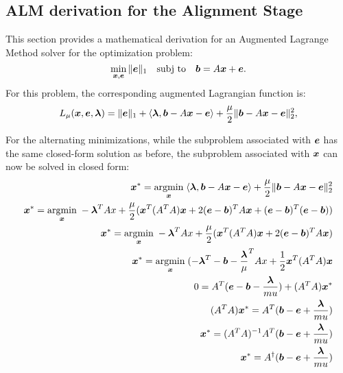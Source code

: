 \subsection{ALM derivation for the Alignment Stage}
This section provides a mathematical derivation for an Augmented Lagrange Method solver
for the optimization problem:
\begin{equation}
\min_{\x, \e} \|\e\|_1 \quad \subj \quad \bb =
A \x + \e.
\end{equation}
For this problem, the corresponding augmented Lagrangian function is:
\begin{equation}
L_\mu (\x,\e,\blambda) = \|\e\|_1 + \langle \blambda, \bb-A\x - \e \rangle + \frac{\mu}{2} \|\bb - A\x - \e\|_2^2,
\end{equation}

For the alternating minimizations, while the subproblem associated with $\e$
has the same closed-form solution as before, the subproblem associated with
$\x$ can now be solved in closed form:
\begin{eqnarray}
\x^* = \argmin{\x} \langle \blambda, \bb-A\x - \e \rangle + \frac{\mu}{2} \|\bb - A\x - \e\|_2^2 \\
\x^* = \argmin{\x} -\blambda^T A x + \frac{\mu}{2} (\x^T(A^T A) \x + 2(\e-\bb)^T A \x + (\e-\bb)^T (\e-\bb)) \\
\x^* = \argmin{\x} -\blambda^T A x + \frac{\mu}{2} (\x^T(A^T A) \x + 2(\e-\bb)^T A \x) \\
\x^* = \argmin{\x} (-\blambda^T -\bb -\frac{\blambda}{\mu}^T A x + \frac{1}{2} \x^T (A^T A) \x \\
0 = A^T(\e - \bb -\frac{\blambda}{mu}) + (A^T A) \x^*\\
(A^T A) \x^* =  A^T (\bb - \e + \frac{\blambda}{mu})\\
\x^* =  (A^T A)^{-1} A^T (\bb - \e + \frac{\blambda}{mu})\\
\x^* =  A^\dagger (\bb - \e + \frac{\blambda}{mu})
\end{eqnarray}


